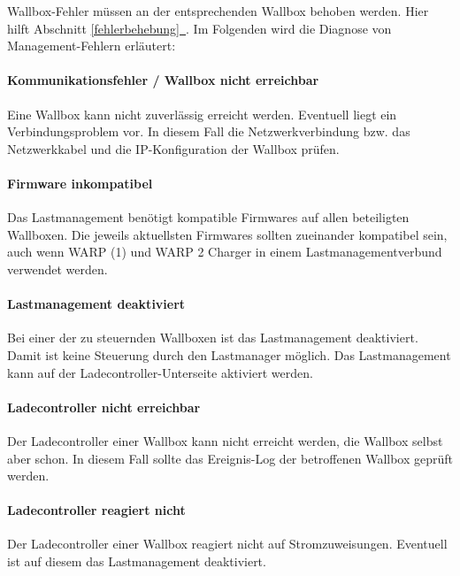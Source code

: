 \documentclass[a4paper,10pt]{article}
\newcommand*{\fullref}[1]{Abschnitt \hyperref[{#1}]{\ref*{#1}~\nameref*{#1}}}
\begin{document}
\begin{multicols*}{2}
    Wallbox-Fehler müssen an der entsprechenden Wallbox behoben werden. Hier
	hilft \fullref{fehlerbehebung}. Im Folgenden wird die Diagnose von Management-Fehlern erläutert:

    \paragraph{Kommunikationsfehler / Wallbox nicht erreichbar}
    Eine Wallbox kann nicht zuverlässig erreicht werden. Eventuell liegt ein
	Verbindungsproblem vor. In diesem Fall die Netzwerkverbindung bzw. das
	Netzwerkkabel und die IP-Konfiguration der Wallbox prüfen.

    \paragraph{Firmware inkompatibel}
    Das Lastmanagement benötigt kompatible Firmwares auf allen beteiligten Wallboxen. Die jeweils aktuellsten Firmwares sollten zueinander kompatibel sein,
    auch wenn WARP (1) und WARP 2 Charger in einem Lastmanagementverbund verwendet werden.

    \paragraph{Lastmanagement deaktiviert}
    Bei einer der zu steuernden Wallboxen ist das Lastmanagement deaktiviert. Damit ist keine Steuerung durch den Lastmanager möglich. Das Lastmanagement kann auf der Ladecontroller-Unterseite aktiviert werden.

    \paragraph{Ladecontroller nicht erreichbar}
    Der Ladecontroller einer Wallbox kann nicht erreicht werden, die Wallbox
	selbst aber schon. In diesem Fall sollte das Ereignis-Log der betroffenen
	Wallbox geprüft werden.

    \paragraph{Ladecontroller reagiert nicht}
    Der Ladecontroller einer Wallbox reagiert nicht auf Stromzuweisungen. Eventuell ist auf diesem das Lastmanagement deaktiviert.


\end{multicols*}
\end{document}
